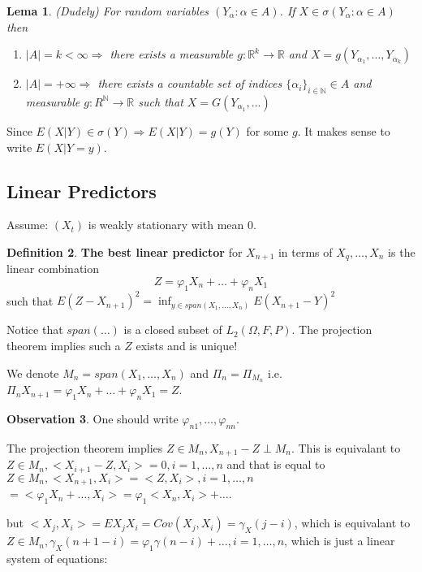 \documentclass[12pt,a4paper]{amsart}
\theoremstyle{definition} %
\newtheorem{defn}{Definition}[section]
\newtheorem{observation}[defn]{Observation}
\theoremstyle{plain} %
\newtheorem{lema}[defn]{Lema}
\newcommand{\R}{\mathbb R}
\newcommand{\N}{\mathbb N}
\begin{document}
\begin{lema} (Dudely)
For random variables $(Y_\alpha: \alpha \in A)$. If $X \in \sigma(Y_\alpha: \alpha \in A)$ then
\begin{enumerate}
\item $|A| = k < \infty \Rightarrow$ there exists a measurable $g: \R^k \rightarrow \R$ and $X = g(Y_{\alpha_1}, \dots, Y_{\alpha_k})$
\item $|A| = +\infty \Rightarrow$ there exists a countable set of indices $\{\alpha_i\}_{i \in \N} \in A$ and measurable
$g: R^\N \rightarrow \R$ such that $X = G(Y_{\alpha_1}, \dots)$
\end{enumerate}
\end{lema}

Since $E(X|Y) \in \sigma(Y) \Rightarrow E(X|Y) = g(Y)$ for some $g$. It makes sense to write $E(X | Y = y)$. 

\subsection{Linear Predictors}

Assume: $(X_t)$ is weakly stationary with mean $0$. 

\begin{defn}
{\bf The best  linear predictor} for $X_{n+1}$ in terms of $X_q, \dots, X_n$ is the linear combination 
$$Z = \varphi_1 X_n + \dots + \varphi_n X_1$$
such that $E(Z - X_{n+1})^2 = \inf_{y \in 
span(X_1, \dots, X_n)} E(X_{n+1} -Y)^2$
\end{defn}

Notice that $span(\dots)$ is a closed subset of $L_2(\Omega, F, P)$. The projection theorem implies such a $Z$ exists and is unique! 

We denote $M_n = span(X_1, \dots, X_n)$ and $\Pi_n = \Pi_{M_n}$ i.e. $\Pi_nX_{n+1} = \varphi_1 X_n + \dots + \varphi_n X_1 = Z$. 

\begin{observation}
One should write $\varphi_{n 1}, \dots, \varphi_{n n}$.
\end{observation}

The projection theorem implies $Z \in M_n, X_{n+1} - Z \perp M_n$. This is equivalant to
$Z \in M_n, <X_{i+1} - Z, X_i> = 0, i = 1, \dots, n$ and that is equal to
$Z \in M_n, <X_{n+1}, X_i> = <Z, X_i>,  i = 1, \dots, n$
$ = <\varphi_1 X_n+ \dots, X_i> = \varphi_1 <X_n, X_i> + \dots$.

but $<X_j, X_i> = E X_j X_i = Cov(X_j, X_i) = \gamma_X(j-i)$, which is equivalant to
$Z \in M_n, \gamma_X(n + 1 -i) = \varphi_1 \gamma(n - i) + \dots, i = 1, \dots, n$, which is just a linear system of equations:
\end{document}
